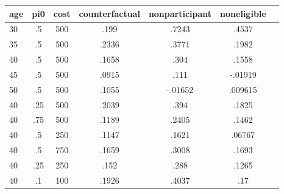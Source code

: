 \begin{table}[htbp]
\begin{tabular}{lcccccc} \hline \hline
 \multicolumn{1}{c}{ age }  & pi0  & cost  & counterfactual  & nonparticipant  & noneligible  \\  \hline 
       30 &        .5 &       500 &      .199 &     .7243 &     .4537 \\  
       35 &        .5 &       500 &     .2336 &     .3771 &     .1982 \\  
       40 &        .5 &       500 &     .1658 &      .304 &     .1558 \\  
       45 &        .5 &       500 &     .0915 &      .111 &   -.01919 \\  
       50 &        .5 &       500 &     .1055 &   -.01652 &   .009615 \\  
       40 &       .25 &       500 &     .2039 &      .394 &     .1825 \\  
       40 &       .75 &       500 &     .1189 &     .2405 &     .1462 \\  
       40 &        .5 &       250 &     .1147 &     .1621 &    .06767 \\  
       40 &        .5 &       750 &     .1659 &     .3008 &     .1693 \\  
       40 &       .25 &       250 &      .152 &      .288 &     .1265 \\  
       40 &        .1 &       100 &     .1926 &     .4037 &       .17 \\  
\hline \hline \end{tabular}
\end{table}
